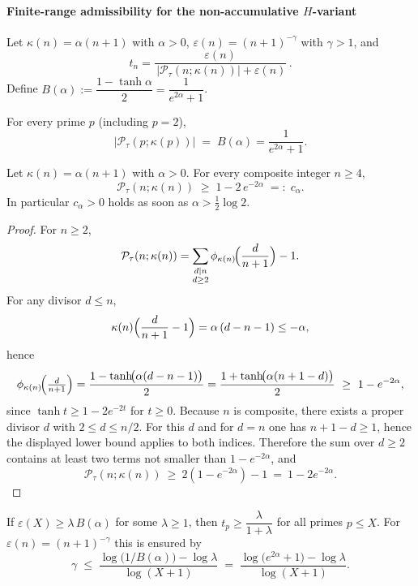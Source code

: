 \paragraph*{Finite-range admissibility for the non-accumulative $H$-variant}
Let $\kappa(n)=\alpha(n+1)$ with $\alpha>0$, $\varepsilon(n)=(n+1)^{-\gamma}$ with $\gamma>1$, and
\[
t_n=\frac{\varepsilon(n)}{\,|\mathcal P_\tau(n;\kappa(n))|+\varepsilon(n)}\,.
\]
Define $B(\alpha):=\dfrac{1-\tanh\alpha}{2}=\dfrac{1}{e^{2\alpha}+1}$.

\begin{lemma}
For every prime $p$ (including $p=2$),
\[
\bigl|\mathcal P_\tau(p;\kappa(p))\bigr| \;=\; B(\alpha)=\frac{1}{e^{2\alpha}+1}.
\]
\end{lemma}

\begin{lemma}\label{lem:uniform-composite-gap}
Let $\kappa(n)=\alpha(n+1)$ with $\alpha>0$. For every composite integer $n\ge 4$,
\[
\mathcal P_\tau(n;\kappa(n))\;\ge\; 1-2\,e^{-2\alpha}\;=:\;c_\alpha.
\]
In particular $c_\alpha>0$ holds as soon as $\alpha>\tfrac12\log 2$.

\begin{proof}
For $n\ge 2$,
\[
\mathcal P_\tau(n;\kappa(n))=\sum_{\substack{d\mid n\\ d\ge 2}}\phi_{\kappa(n)}\!\Bigl(\frac{d}{n+1}\Bigr)-1.
\]
For any divisor $d\le n$,
\[
\kappa(n)\Bigl(\frac{d}{n+1}-1\Bigr)=\alpha\,(d-n-1)\le -\alpha,
\]
hence
\[
\phi_{\kappa(n)}\!\Bigl(\tfrac{d}{n+1}\Bigr)
=\frac{1-\tanh\!\bigl(\alpha(d-n-1)\bigr)}{2}
=\frac{1+\tanh\!\bigl(\alpha(n+1-d)\bigr)}{2}
\ \ge\ 1-e^{-2\alpha},
\]
since $\tanh t\ge 1-2e^{-2t}$ for $t\ge 0$. Because $n$ is composite, there exists a proper divisor $d$ with $2\le d\le n/2$. For this $d$ and for $d=n$ one has $n+1-d\ge 1$, hence the displayed lower bound applies to both indices. Therefore the sum over $d\ge 2$ contains at least two terms not smaller than $1-e^{-2\alpha}$, and
\[
\mathcal P_\tau(n;\kappa(n))
\ \ge\ 2(1-e^{-2\alpha})-1
\ =\ 1-2e^{-2\alpha}.
\]
\end{proof}
\end{lemma}


\begin{corollary}
If $\varepsilon(X)\ge \lambda\,B(\alpha)$ for some $\lambda\ge 1$, then $t_p\ge \dfrac{\lambda}{1+\lambda}$ for all primes $p\le X$.
For $\varepsilon(n)=(n+1)^{-\gamma}$ this is ensured by
\[
\gamma \;\le\; \frac{\log\!\bigl(1/B(\alpha)\bigr)-\log \lambda}{\log(X+1)}
 \;=\; \frac{\log\!\bigl(e^{2\alpha}+1\bigr)-\log \lambda}{\log(X+1)}.
\]
\end{corollary}


